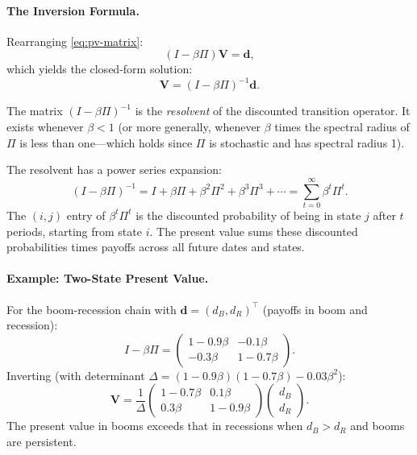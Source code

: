 \paragraph{The Inversion Formula.}
Rearranging \eqref{eq:pv-matrix}:
\begin{equation}
(I - \beta \Pi) \mathbf{V} = \mathbf{d},
\label{eq:pv-rearranged}
\end{equation}
which yields the closed-form solution:
\begin{equation}
\boxed{\mathbf{V} = (I - \beta \Pi)^{-1} \mathbf{d}.}
\label{eq:pv-inversion}
\end{equation}

The matrix $(I - \beta \Pi)^{-1}$ is the \emph{resolvent} of the discounted transition operator. It exists whenever $\beta < 1$ (or more generally, whenever $\beta$ times the spectral radius of $\Pi$ is less than one---which holds since $\Pi$ is stochastic and has spectral radius 1).

\begin{calloutnote}
The resolvent has a power series expansion:
\begin{equation}
(I - \beta \Pi)^{-1} = I + \beta \Pi + \beta^2 \Pi^2 + \beta^3 \Pi^3 + \cdots = \sum_{t=0}^{\infty} \beta^t \Pi^t.
\label{eq:resolvent-series}
\end{equation}
The $(i,j)$ entry of $\beta^t \Pi^t$ is the discounted probability of being in state $j$ after $t$ periods, starting from state $i$. The present value sums these discounted probabilities times payoffs across all future dates and states.
\end{calloutnote}

\paragraph{Example: Two-State Present Value.}
For the boom-recession chain with $\mathbf{d} = (d_B, d_R)^\top$ (payoffs in boom and recession):
\begin{equation}
I - \beta \Pi = \begin{pmatrix}
1 - 0.9\beta & -0.1\beta \\
-0.3\beta & 1 - 0.7\beta
\end{pmatrix}.
\label{eq:two-state-resolvent-matrix}
\end{equation}
Inverting (with determinant $\Delta = (1-0.9\beta)(1-0.7\beta) - 0.03\beta^2$):
\begin{equation}
\mathbf{V} = \frac{1}{\Delta} \begin{pmatrix}
1 - 0.7\beta & 0.1\beta \\
0.3\beta & 1 - 0.9\beta
\end{pmatrix} \begin{pmatrix} d_B \\ d_R \end{pmatrix}.
\label{eq:two-state-pv}
\end{equation}
The present value in booms exceeds that in recessions when $d_B > d_R$ and booms are persistent.

